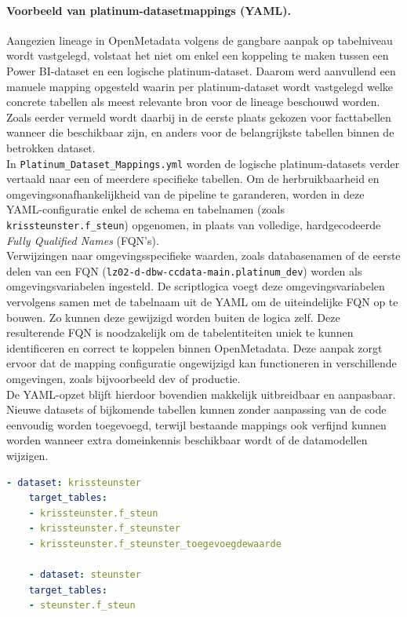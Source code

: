 \paragraph{Voorbeeld van platinum-datasetmappings (YAML).}

Aangezien lineage in OpenMetadata volgens de gangbare aanpak op tabelniveau wordt vastgelegd, volstaat het niet om enkel een koppeling te maken tussen een Power BI-dataset en een logische platinum-dataset. Daarom werd aanvullend een manuele mapping opgesteld waarin per platinum-dataset wordt vastgelegd welke concrete tabellen als meest relevante bron voor de lineage beschouwd worden. Zoals eerder vermeld wordt daarbij in de eerste plaats gekozen voor facttabellen wanneer die beschikbaar zijn, en anders voor de belangrijkste tabellen binnen de betrokken dataset.\\

In \texttt{Platinum\_Dataset\_Mappings.yml} worden de logische platinum-datasets verder vertaald naar een of meerdere specifieke tabellen. Om de herbruikbaarheid en omgevingsonafhankelijkheid van de pipeline te garanderen, worden in deze YAML-configuratie enkel de schema en tabelnamen (zoals \texttt{krissteunster.f\_steun}) opgenomen, in plaats van volledige, hardgecodeerde \textit{Fully Qualified Names} (FQN's).\\

Verwijzingen naar omgevingsspecifieke waarden, zoals databasenamen of de eerste delen van een FQN  (\texttt{lz02-d-dbw-ccdata-main.platinum\_dev}) worden als omgevingsvariabelen ingesteld. De scriptlogica voegt deze omgevingsvariabelen vervolgens samen met de tabelnaam uit de YAML om de uiteindelijke FQN op te bouwen. Zo kunnen deze gewijzigd worden buiten de logica zelf. Deze resulterende FQN is noodzakelijk om de tabelentiteiten uniek te kunnen identificeren en correct te koppelen binnen OpenMetadata. Deze aanpak zorgt ervoor dat de mapping configuratie ongewijzigd kan functioneren in verschillende omgevingen, zoals bijvoorbeeld dev of productie.\\

De YAML-opzet blijft hierdoor bovendien makkelijk uitbreidbaar en aanpasbaar. Nieuwe datasets of bijkomende tabellen kunnen zonder aanpassing van de code eenvoudig worden toegevoegd, terwijl bestaande mappings ook verfijnd kunnen worden wanneer extra domeinkennis beschikbaar wordt of de datamodellen wijzigen.\\

\begin{lstlisting}[language=YAML, caption={Fragment uit Platinum\_Dataset\_Mappings.yml}, label={lst:yaml-platinum}]
	- dataset: krissteunster
	target_tables:
	- krissteunster.f_steun
	- krissteunster.f_steunster
	- krissteunster.f_steunster_toegevoegdewaarde
	
	- dataset: steunster
	target_tables:
	- steunster.f_steun
\end{lstlisting}


